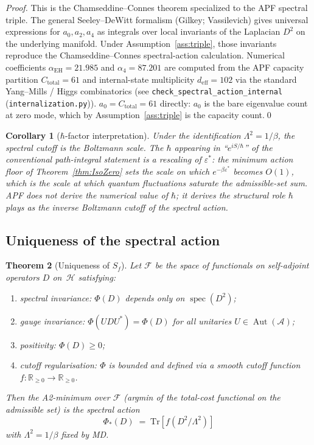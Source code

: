 \documentclass[11pt,a4paper]{article}
\newtheorem{theorem}{Theorem}[section]
\newtheorem{corollary}[theorem]{Corollary}
\theoremstyle{definition}
\newcommand{\epsstar}{\varepsilon^{\ast}}
\newcommand{\Ctot}{C_{\mathrm{total}}}
\newcommand{\deff}{d_{\mathrm{eff}}}
\newcommand{\Tr}{\mathrm{Tr}}
\DeclareMathOperator{\spec}{spec}
\DeclareMathOperator{\Aut}{Aut}
\newcommand{\coderef}[2]{\texttt{#1}\,(\texttt{#2})}
\begin{document}
\begin{proof}
This is the Chamseddine--Connes theorem specialized to the APF spectral triple.  The general Seeley--DeWitt formalism (Gilkey; Vassilevich) gives universal expressions for $a_0, a_2, a_4$ as integrals over local invariants of the Laplacian $D^2$ on the underlying manifold.  Under Assumption~\ref{ass:triple}, those invariants reproduce the Chamseddine--Connes spectral-action calculation.  Numerical coefficients $\alpha_{\mathrm{EH}}=21.985$ and $\alpha_4=87.201$ are computed from the APF capacity partition $\Ctot=61$ and internal-state multiplicity $\deff=102$ via the standard Yang--Mills / Higgs combinatorics (see \coderef{check\_spectral\_action\_internal}{internalization.py}).  $a_0=\Ctot=61$ directly: $a_0$ is the bare eigenvalue count at zero mode, which by Assumption~\ref{ass:triple} is the capacity count.\qed
\end{proof}

\begin{corollary}[$\hbar$-factor interpretation]
Under the identification $\Lambda^2=1/\beta$, the spectral cutoff is the Boltzmann scale.  The $\hbar$ appearing in ``$e^{iS/\hbar}$'' of the conventional path-integral statement is a rescaling of $\epsstar$: the minimum action floor of Theorem~\ref{thm:IsoZero} sets the scale on which $e^{-\beta\epsstar}$ becomes $O(1)$, which is the scale at which quantum fluctuations saturate the admissible-set sum.  APF does not derive the numerical value of $\hbar$; it derives the structural role $\hbar$ plays as the inverse Boltzmann cutoff of the spectral action.
\end{corollary}

\subsection{Uniqueness of the spectral action}

\begin{theorem}[Uniqueness of $S_f$]
\label{thm:SAuniq}
Let $\mathcal{F}$ be the space of functionals on self-adjoint operators $D$ on~$\mathcal{H}$ satisfying:
\begin{enumerate}[label=(U\arabic*),nosep]
  \item \emph{spectral invariance}: $\Phi(D)$ depends only on $\spec(D^2)$;
  \item \emph{gauge invariance}: $\Phi(UDU^*)=\Phi(D)$ for all unitaries $U\in\Aut(\mathcal{A})$;
  \item \emph{positivity}: $\Phi(D)\geq 0$;
  \item \emph{cutoff regularisation}: $\Phi$ is bounded and defined via a smooth cutoff function $f:\mathbb{R}_{\geq 0}\to\mathbb{R}_{\geq 0}$.
\end{enumerate}
Then the A2-minimum over $\mathcal{F}$ (argmin of the total-cost functional on the admissible set) is the spectral action
\[
   \Phi_*(D) \;=\; \Tr\!\left[f\!\left(D^2/\Lambda^2\right)\right]
\]
with $\Lambda^2=1/\beta$ fixed by MD.
\end{theorem}
\end{document}
